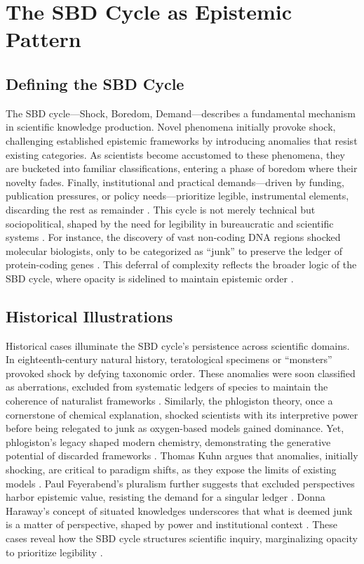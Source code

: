 \documentclass[12pt]{article}
\begin{document}
\section{The SBD Cycle as Epistemic Pattern}

\subsection{Defining the SBD Cycle}
The SBD cycle---Shock, Boredom, Demand---describes a fundamental mechanism in scientific knowledge production. Novel phenomena initially provoke shock, challenging established epistemic frameworks by introducing anomalies that resist existing categories. As scientists become accustomed to these phenomena, they are bucketed into familiar classifications, entering a phase of boredom where their novelty fades. Finally, institutional and practical demands---driven by funding, publication pressures, or policy needs---prioritize legible, instrumental elements, discarding the rest as remainder \citep{latour1987, scott1998}. This cycle is not merely technical but sociopolitical, shaped by the need for legibility in bureaucratic and scientific systems \citep{jasanoff2004}. For instance, the discovery of vast non-coding DNA regions shocked molecular biologists, only to be categorized as ``junk'' to preserve the ledger of protein-coding genes \citep{ohno1972}. This deferral of complexity reflects the broader logic of the SBD cycle, where opacity is sidelined to maintain epistemic order \citep{bowker2005}.

\subsection{Historical Illustrations}
Historical cases illuminate the SBD cycle’s persistence across scientific domains. In eighteenth-century natural history, teratological specimens or ``monsters'' provoked shock by defying taxonomic order. These anomalies were soon classified as aberrations, excluded from systematic ledgers of species to maintain the coherence of naturalist frameworks \citep{daston1998}. Similarly, the phlogiston theory, once a cornerstone of chemical explanation, shocked scientists with its interpretive power before being relegated to junk as oxygen-based models gained dominance. Yet, phlogiston’s legacy shaped modern chemistry, demonstrating the generative potential of discarded frameworks \citep{shapin1996}. Thomas Kuhn argues that anomalies, initially shocking, are critical to paradigm shifts, as they expose the limits of existing models \citep{kuhn1962}. Paul Feyerabend’s pluralism further suggests that excluded perspectives harbor epistemic value, resisting the demand for a singular ledger \citep{feyerabend1975}. Donna Haraway’s concept of situated knowledges underscores that what is deemed junk is a matter of perspective, shaped by power and institutional context \citep{haraway1988}. These cases reveal how the SBD cycle structures scientific inquiry, marginalizing opacity to prioritize legibility \citep{bowker2005}.
\end{document}

